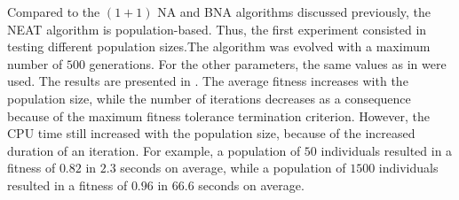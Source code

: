 Compared to the $(1 + 1)$ NA and BNA algorithms discussed previously, the NEAT algorithm is population-based.
Thus, the first experiment consisted in testing different population sizes.The algorithm was evolved with a maximum number of $500$ generations. For the other parameters, the same values as in \cite{neat} were used.
The results are presented in . The average fitness increases with the population size, while the number of iterations decreases as a consequence because of the maximum fitness tolerance termination
criterion. However, the CPU time still increased with the population size, because of the increased duration of an iteration. For example, a population of $50$ individuals resulted in a fitness of $0.82$ in $2.3$ seconds
on average, while a population of $1500$ individuals resulted in a fitness of $0.96$ in $66.6$ seconds on average.

